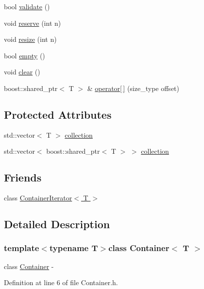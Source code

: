 \begin{DoxyCompactItemize}
bool \hyperlink{class_container_aa99a036fd0fe6d6b82ba558157e557d3}{validate} ()
\item 
void \hyperlink{class_container_aa3cbae68ebeed649c52eb3805a30fb75}{reserve} (int n)
\item 
void \hyperlink{class_container_ab77ce6f8173bd47c4cf46643317dffdb}{resize} (int n)
\item 
bool \hyperlink{class_container_ab8e09c25f519687468ef5b9f0fae9b3e}{empty} ()
\item 
void \hyperlink{class_container_aab0690d44c8e04614cea46935ff49e7a}{clear} ()
\item 
boost::shared\_\-ptr$<$ T $>$ \& \hyperlink{class_container_aed3c227120a6a745fa9adfb25c3dd225}{operator\mbox{[}$\,$\mbox{]}} (size\_\-type offset)
\end{DoxyCompactItemize}
\subsection*{Protected Attributes}
\begin{DoxyCompactItemize}
\item 
std::vector$<$ T $>$ \hyperlink{class_container_a67d3456948d7bb2e905f64f75a52d5a9}{collection}
\item 
std::vector$<$ boost::shared\_\-ptr$<$ T $>$ $>$ \hyperlink{class_container_a6cc12233bceb7d72709320d2c57e3398}{collection}
\end{DoxyCompactItemize}
\subsection*{Friends}
\begin{DoxyCompactItemize}
\item 
class \hyperlink{class_container_aa4ab453faa4914282441502e99a0afb1}{ContainerIterator$<$ T $>$}
\end{DoxyCompactItemize}


\subsection{Detailed Description}
\subsubsection*{template$<$typename T$>$class Container$<$ T $>$}

class \hyperlink{class_container}{Container} -\/ 

Definition at line 6 of file Container.h.



